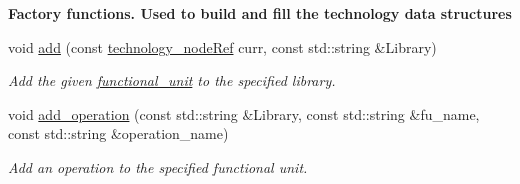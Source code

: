 \begin{Indent}\textbf{ Factory functions. Used to build and fill the technology data structures}\par
\begin{DoxyCompactItemize}
\item 
void \hyperlink{classtechnology__manager_aab46c03c87a27bec53894e1d3ae9b97b}{add} (const \hyperlink{technology__node_8hpp_a33dd193b7bd6b987bf0d8a770a819fa7}{technology\+\_\+node\+Ref} curr, const std\+::string \&Library)
\begin{DoxyCompactList}\small\item\em Add the given \hyperlink{structfunctional__unit}{functional\+\_\+unit} to the specified library. \end{DoxyCompactList}\item 
void \hyperlink{classtechnology__manager_a2a5555fe0295bf0881902f5fd2730c0b}{add\+\_\+operation} (const std\+::string \&Library, const std\+::string \&fu\+\_\+name, const std\+::string \&operation\+\_\+name)
\begin{DoxyCompactList}\small\item\em Add an operation to the specified functional unit. \end{DoxyCompactList}\end{DoxyCompactItemize}
\end{Indent}
